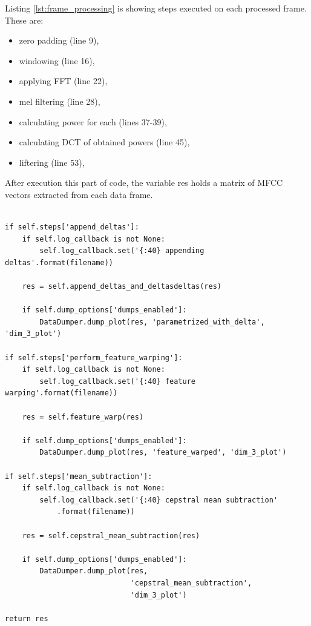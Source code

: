 \documentclass[magister]{dyplom}
\begin{document}
	Listing \ref{lst:frame_processing} is showing steps executed on each processed frame. These are:
	
	\begin{itemize}
		\item zero padding (line 9),
		\item windowing (line 16),
		\item applying \gls{FFT} (line 22),
		\item mel filtering (line 28),
		\item calculating power for each (lines 37-39),
		\item calculating \gls{DCT} of obtained powers (line 45),
		\item liftering (line 53),
	\end{itemize}
	
	After execution this part of code, the variable res holds a matrix of \gls{MFCC} vectors extracted from each data frame.\\
	
	\begingroup
	\begin{verbatim}
	
if self.steps['append_deltas']:
    if self.log_callback is not None:
        self.log_callback.set('{:40} appending deltas'.format(filename))

    res = self.append_deltas_and_deltasdeltas(res)

    if self.dump_options['dumps_enabled']:
        DataDumper.dump_plot(res, 'parametrized_with_delta', 'dim_3_plot')

if self.steps['perform_feature_warping']:
    if self.log_callback is not None:
        self.log_callback.set('{:40} feature warping'.format(filename))

    res = self.feature_warp(res)

    if self.dump_options['dumps_enabled']:
        DataDumper.dump_plot(res, 'feature_warped', 'dim_3_plot')

if self.steps['mean_subtraction']:
    if self.log_callback is not None:
        self.log_callback.set('{:40} cepstral mean subtraction'
            .format(filename))

    res = self.cepstral_mean_subtraction(res)

    if self.dump_options['dumps_enabled']:
        DataDumper.dump_plot(res, 
                             'cepstral_mean_subtraction',
                             'dim_3_plot')

return res
	\end{verbatim}
	\endgroup
	\vspace{1em}
		
\end{document}
